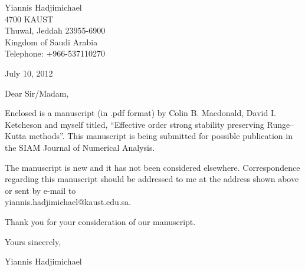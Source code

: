 \documentclass[10pt,a4paper,oneside]{article}
\renewcommand{\newline}{\vspace{10pt}}
\begin{document}
\begin{flushright}
Yiannis Hadjimichael \\
4700 KAUST \\
Thuwal, Jeddah 23955-6900 \\
Kingdom of Saudi Arabia \\
Telephone: +966-537110270 \\\vspace{10pt}

July 10, 2012
\end{flushright}


Dear Sir/Madam,
\newline

Enclosed is a manuscript (in .pdf format) by Colin B. Macdonald, 
David I. Ketcheson and myself titled, 
``Effective order strong stability preserving Runge--Kutta methods''. 
This manuscript is being submitted for possible publication in the 
SIAM Journal of Numerical Analysis.
\newline

The manuscript is new and it has not been considered elsewhere. 
Correspondence regarding this manuscript should be addressed to me at
the address shown above or sent by e-mail to \\
yiannis.hadjimichael@kaust.edu.sa.
\newline

Thank you for your consideration of our manuscript. 
\newline
\vspace{20pt}

Yours sincerely,
\newline

Yiannis Hadjimichael
\end{document}
